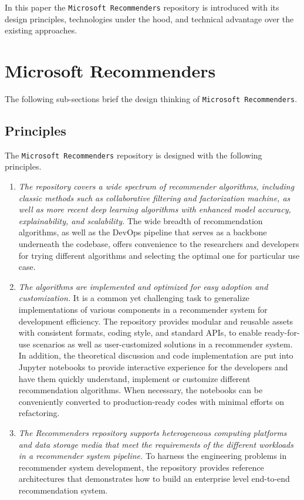 \documentclass[twoside,11pt]{article}
\begin{document}
In this paper the \verb|Microsoft Recommenders| repository is introduced with its design principles, technologies under the hood, and technical advantage over the existing approaches.

\section{Microsoft Recommenders}
The following sub-sections brief the design thinking of \verb|Microsoft Recommenders|.

\subsection{Principles}
The \verb|Microsoft Recommenders| repository is designed with the following principles.
\begin{enumerate}
\item \emph{The repository covers a wide spectrum of recommender algorithms, including classic methods such as collaborative filtering and factorization machine, as well as more recent deep learning algorithms with enhanced model accuracy, explainability, and scalability.} The wide breadth of recommendation algorithms, as well as the DevOps pipeline that serves as a backbone underneath the codebase, offers convenience to the researchers and developers for trying different algorithms and selecting the optimal one for particular use case. 
\item \emph{The algorithms are implemented and optimized for easy adoption and customization.} It is a common yet challenging task to generalize implementations of various components in a recommender system for development efficiency. The repository provides modular and reusable assets with consistent formats, coding style, and standard APIs, to enable ready-for-use scenarios as well as user-customized solutions in a recommender system. In addition, the theoretical discussion and code implementation are put into Jupyter notebooks to provide interactive experience for the developers and have them quickly understand, implement or customize different recommendation algorithms. When necessary, the notebooks can be conveniently converted to production-ready codes with minimal efforts on refactoring. 
\item \emph{The Recommenders repository supports heterogeneous computing platforms and data storage media that meet the requirements of the different workloads in a recommender system pipeline.} To harness the engineering problems in recommender system development, the repository provides reference architectures that demonstrates how to build an enterprise level end-to-end recommendation system.  
\end{enumerate}
\end{document}
